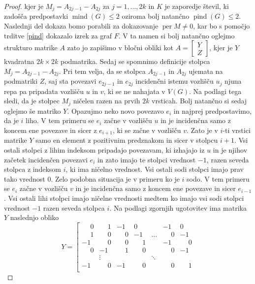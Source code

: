 \documentclass[12pt,a4paper,twoside]{article}
\theoremstyle{definition} %
\theoremstyle{plain} %
\numberwithin{equation}{section}  %
\newcommand{\Z}{\mathbb Z}
\DeclareMathOperator{\per}{per}
\DeclareMathOperator{\mind}{mind}
\DeclareMathOperator{\pind}{pind}
\begin{document}
\begin{proof}
kjer je $M_j = A_{2j - 1} - A_{2j}$ za $j=1, \ldots, 2k$ in $K$ je zaporedje števil, ki zadošča predpostavki $\mind(G) \le 2$ oziroma bolj natančno $\pind(G) \le 2$. Naslednji del dokaza bomo porabili za dokazovanje $\per M \neq 0$, kar bo s pomočjo trditve \ref{pind} dokazalo izrek za graf $F$. V ta namen si bolj natančno oglejmo strukturo matrike $A$ zato jo zapišimo v bločni obliki kot $ A=\begin{bmatrix}Y \\Z \end{bmatrix}  $, kjer je $Y$ kvadratna $2k \times 2k$ podmatrika. Sedaj se spomnimo definicije stolpca $M_j = A_{2j - 1} - A_{2j}$. Pri tem velja, da se stolpca $A_{2j - 1}$ in $A_{2j}$ ujemata na podmatriki $Z$, saj sta povezavi $e_{2j - 1}$ in $e_{2j}$ incidenčni istemu vozlišču $u_j$ njuna repa pa pripadata vozlišču $u$ in $v$, ki se ne nahajata v $V(G)$. Na podlagi tega sledi, da je stolpec $M_j$ ničelen razen na prvih $2k$ vrsticah. Bolj natančno si sedaj oglejmo še matriko $Y$. Opazujmo neko novo povezavo $e_i$ in najprej predpostavimo, da je $i$ liho. V tem primeru se  $e_i$ začne v vozlišču $u$ in je incidenčna samo z koncem ene povezave in sicer z $e_{i+1}$, ki se začne v vozlišču $v$. Zato je v $i$-ti vrstici matrike $Y$ samo en element z pozitivnim predznakom in sicer v stolpcu $i+1$. Vsi ostali stolpci z lihim indeksom pripadajo povezavam, ki izhajajo iz $u$ in je njihov začetek incidenčen povezavi $e_i$ in zato imajo te stolpci vrednost $-1$, razen seveda stolpca z indeksom $i$, ki ima ničelno vrednost. Vsi ostali sodi stolpci imajo prav tako vrednost $0$. Zelo podobna situacija je v primeru ko je $i$ sodo. V tem primeru se $e_i$ začne v vozlišču $v$ in je incidenčna samo z koncem ene povezave in sicer $e_{i-1}$. Vsi ostali lihi stolpci imajo ničelne vrednosti medtem ko imajo vsi sodi stolpci vrednost $-1$ razen seveda stolpca $i$. Na podlagi zgornjih ugotovitev ima matrika $Y$ naslednjo obliko
$$ Y= \left[ \begin{matrix} 
\phantom{-}0 & \phantom{-}1 & -1 & 0 &  & -1 & 0 \\
 \phantom{-}1 &\phantom{-} 0 & \phantom{-}0 & -1 & \ldots  & \phantom{-}0 & -1 \\ 
-1 & \phantom{-}0 & \phantom{-}0 & \phantom{-}1 &  & -1 & \phantom{-}0 \\ 
\phantom{-}0 & -1 & \phantom{-}1 & \phantom{-}0 &  & \phantom{-}0 & -1 \\ 
 & \vdots &  &  & \ddots &  &  \\ 
-1 & \phantom{-}0 & -1 & \phantom{-}0 &  & \phantom{-}0 & \phantom{-}1 \\ 

\end{matrix}$$
\end{proof}
\end{document}
